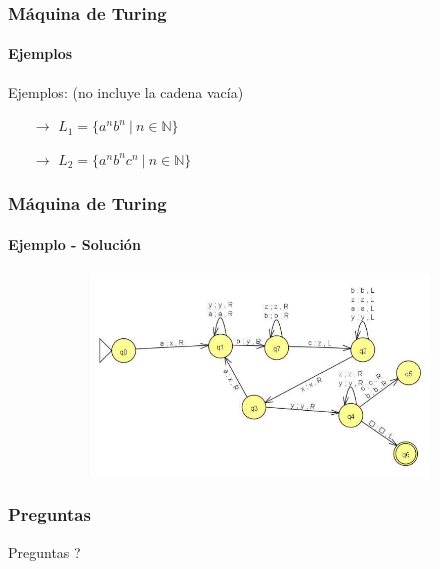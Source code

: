 \documentclass{beamer}
\begin{document}
        \begin{frame}
            \frametitle{M\'aquina de Turing}
            \framesubtitle{Ejemplos}

			\begin{exampleblock}{Ejemplos: (no incluye la cadena vac\'ia)}
			    \begin{itemize}
                    \item[$\rightarrow$] $L_{1}=\{a^{n}b^{n}~|~n \in \mathbb{N}\}$
                    \item[$\rightarrow$] $L_{2}=\{a^{n}b^{n}c^{n}~|~n \in \mathbb{N}\}$
                \end{itemize}
			\end{exampleblock}
		\end{frame}

        \begin{frame}
            \frametitle{M\'aquina de Turing}
            \framesubtitle{Ejemplo - Soluci\'on}

            \begin{figure}[H]
                \begin{figure}
                    \begin{center}
                        \includegraphics[scale=.5]{images/eje2.png}
                    \end{center}
                \end{figure}
            \end{figure}
		\end{frame}

		\begin{frame}
			\frametitle{Preguntas}

			\hspace{4cm}\huge{Preguntas ?}
		
		\end{frame}
	
\end{document}
